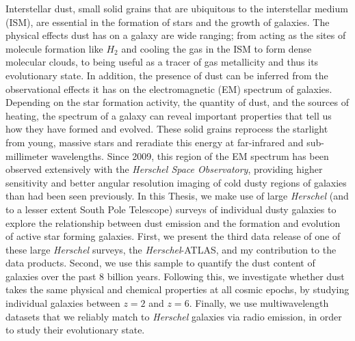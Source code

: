 Interstellar dust, small solid grains that are ubiquitous to the interstellar medium (ISM), are essential in the formation of stars and the growth of galaxies. The physical effects dust has on a galaxy are wide ranging; from acting as the sites of molecule formation like $H_2$ and cooling the gas in the ISM to form dense molecular clouds, to being useful as a tracer of gas metallicity and thus its evolutionary state. In addition, the presence of dust can be inferred from the observational effects it has on the electromagnetic (EM) spectrum of galaxies. Depending on the star formation activity, the quantity of dust, and the sources of heating, the spectrum of a galaxy can reveal important properties that tell us how they have formed and evolved. These solid grains reprocess the starlight from young, massive stars and reradiate this energy at far-infrared and sub-millimeter wavelengths. Since 2009, this region of the EM spectrum has been observed extensively with the \textit{Herschel Space Observatory}, providing higher sensitivity and better angular resolution imaging of cold dusty regions of galaxies than had been seen previously. In this Thesis, we make use of large \textit{Herschel} (and to a lesser extent South Pole Telescope) surveys of individual dusty galaxies to explore the relationship between dust emission and the formation and evolution of active star forming galaxies. First, we present the third data release of one of these large \textit{Herschel} surveys, the \textit{Herschel}-ATLAS, and my contribution to the data products. Second, we use this sample to quantify the dust content of galaxies over the past $8$ billion years. Following this, we investigate whether dust takes the same physical and chemical properties at all cosmic epochs, by studying individual galaxies between $z = 2$ and $z = 6$. Finally, we use multiwavelength datasets that we reliably match to \textit{Herschel} galaxies via radio emission, in order to study their evolutionary state.